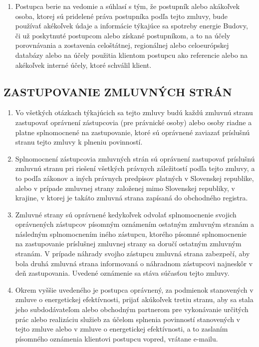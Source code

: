 \documentclass[a4paper]{article}
\begin{document}
\begin{multicols}{2}
\begin{enumerate}
   	\item Postupca berie na vedomie a súhlasí s tým, že postupník alebo akákoľvek osoba, ktorej sú pridelené práva postupníka podľa tejto zmluvy, bude používať akékoľvek údaje a informácie týkajúce sa spotreby energie Budovy, či už poskytnuté postupcom alebo získané postupníkom, a to na účely porovnávania a zostavenia celoštátnej, regionálnej alebo celoeurópskej databázy alebo na účely použitia klientom postupcu ako referencie alebo na akékoľvek interné účely, ktoré schválil klient.
\end{enumerate}
\subsection{ZASTUPOVANIE ZMLUVNÝCH STRÁN}
\begin{enumerate}
    \item Vo všetkých otázkach týkajúcich sa tejto zmluvy budú každú zmluvnú stranu zastupovať oprávnení zástupcovia (pre právnické osoby) alebo osoby riadne a platne splnomocnené na zastupovanie, ktoré sú oprávnené zaviazať príslušnú stranu tejto zmluvy k plneniu povinností.
    \item Splnomocnení zástupcovia zmluvných strán sú oprávnení zastupovať príslušnú zmluvnú stranu pri riešení všetkých právnych záležitostí podľa tejto zmluvy, a to podľa zákonov a iných právnych predpisov platných v Slovenskej republike, alebo v prípade zmluvnej strany založenej mimo Slovenskej republiky, v krajine, v ktorej je takáto zmluvná strana zapísaná do obchodného registra.  
    \item Zmluvné strany sú oprávnené kedykoľvek odvolať splnomocnenie svojich oprávnených zástupcov písomným oznámením ostatným zmluvným stranám a následným splnomocnením iného zástupcu, ktorého písomné splnomocnenie na zastupovanie príslušnej zmluvnej strany sa doručí ostatným zmluvným stranám. V prípade náhrady svojho zástupcu zmluvná strana zabezpečí, aby bola druhá zmluvná strana informovaná o náhradnom zástupcovi najneskôr v deň zastupovania. Uvedené oznámenie sa stáva súčasťou tejto zmluvy. 
    \item Okrem vyššie uvedeného je postupca oprávnený, za podmienok stanovených v zmluve o energetickej efektívnosti, prijať akúkoľvek tretiu stranu, aby sa stala jeho subdodávateľom alebo obchodným partnerom pre vykonávanie určitých prác alebo realizáciu služieb za účelom splnenia povinností stanovených v tejto zmluve alebo v zmluve o energetickej efektívnosti, a to zaslaním písomného oznámenia klientovi postupcu vopred, vrátane e-mailu.
\end{enumerate}

\end{multicols}
\end{document}
